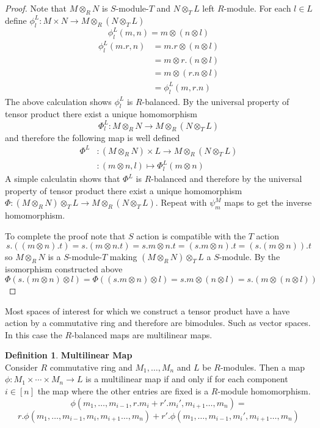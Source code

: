 \documentclass{article}
\theoremstyle{plain}
\theoremstyle{definition}
\newtheorem{defn}{Definition}[section]
\theoremstyle{remark}
\begin{document}
  \begin{proof}
    Note that $M\otimes_RN$ is $S$-module-$T$ and $N\otimes_TL$ left $R$-module.
    For each $l\in L$ define $\phi_l^L:M\times N\to M\otimes_R(N\otimes_TL)$
    \[\phi_l^L(m,n) = m\otimes (n\otimes l)\]
    \begin{align*}
      \phi_l^L(m.r,n) &= m.r\otimes(n\otimes l) \\
      &= m\otimes r.(n\otimes l) \\
      &= m\otimes (r.n\otimes l) \\
      &= \phi_l^L(m,r.n)
    \end{align*}
    The above calculation shows $\phi_l^L$ is $R$-balanced. By the universal 
    property of tensor product there exist a unique homomorphism
    \[ \Phi_l^L:M\otimes_RN\to M\otimes_R(N\otimes_TL) \]
    and therefore the following map is well defined
    \begin{align*}
      \Phi^L&:(M\otimes_RN)\times L\to M\otimes_R(N\otimes_T L)\\
      &:(m\otimes n,l)\mapsto \Phi_l^L(m\otimes n)
    \end{align*}
    A simple calculatin shows that $\Phi^L$ is $R$-balanced and therefore by
    the universal property of tensor product there exist a unique homomorphism
    $\Phi:(M\otimes_R N)\otimes_TL\to M\otimes_R(N\otimes_TL)$. Repeat with
    $\psi_m^M$ maps to get the inverse homomorphism.

    To complete the proof note that $S$ action is compatible with the $T$ action
    \[s.((m\otimes n).t)=s.(m\otimes n.t)=s.m\otimes n.t = (s.m\otimes n).t=(s.(m\otimes n)).t \]
    so $M\otimes_RN$ is a $S$-module-$T$ making $(M\otimes_RN)\otimes_TL$ a $S$-module.
    By the isomorphism constructed above $\Phi(s.(m\otimes n)\otimes l)=\Phi((s.m\otimes n)\otimes l)=s.m\otimes(n\otimes l)=s.(m\otimes(n\otimes l))$
  \end{proof}
  Most spaces of interest for which we construct a tensor product have
  a have action by a commutative ring and therefore are bimodules. Such
  as vector spaces. In this case the $R$-balanced maps are multilinear maps.
  \begin{defn}\textbf{Multilinear Map}\\
    Consider $R$ commutative ring and $M_1,\ldots,M_n$ and $L$ be 
    $R$-modules. Then a map $\phi:M_1\times\cdots\times M_n\to L$
    is a multilinear map if and only if for each component $i\in[n]$
    the map where the other entries are fixed is a $R$-module homomorphism.
    \[\phi(m_1,\ldots,m_{i-1},r.m_i+r'.m_i',m_{i+1}\ldots,m_n)=\]
    \[r.\phi(m_1,\ldots,m_{i-1},m_i,m_{i+1}\ldots,m_n)+
    r'.\phi(m_1,\ldots,m_{i-1},m_i',m_{i+1}\ldots,m_n)\]
  \end{defn}
\end{document}
